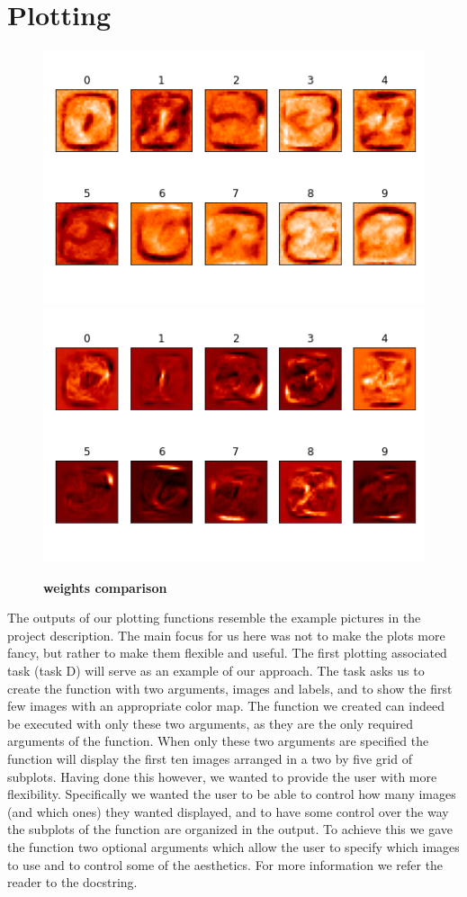 \documentclass[letterpaper, 12 pt, conference]{ieeeconf}
\begin{document}
\section{Plotting}

\begin{figure}[h]
\caption{\textbf{weights comparison}}
\centering
\includegraphics[scale=0.4]{"../images/linear_network"}
\includegraphics[scale=0.4]{"../images/fast_network"}
\end{figure}

The outputs of our plotting functions resemble the example pictures in the project description. The main focus for us here was not to make the plots more fancy, but rather to make them flexible and useful. The first plotting associated task (task D) will serve as an example of our approach. The task asks us to create the function with two arguments, images and labels, and to show the first few images with an appropriate color map. The function we created can indeed be executed with only these two arguments, as they are the only required arguments of the function. When only these two arguments are specified the function will display the first ten images arranged in a two by five grid of subplots. Having done this however, we wanted to provide the user with more flexibility. Specifically we wanted the user to be able to control how many images (and which ones) they wanted displayed, and to have some control over the way the subplots of the function are organized in the output. To achieve this we gave the function two optional arguments which allow the user to specify which images to use and to control some of the aesthetics. For more information we refer the reader to the docstring. 
\end{document}
